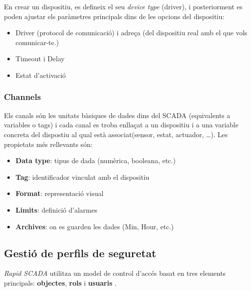 \documentclass[a4paper,11pt,DIV=13,headings=normal,abstract=true,twoside=semi]{article}
\newcommand{\acro}[1]{\textsc{#1}}
\begin{document}
En crear un dispositiu, es defineix el seu \emph{device type} (driver), i posteriorment es poden ajustar els paràmetres principals dins de les opcions del dispositiu:


\begin{itemize}
    \item Driver (protocol de comunicació) i adreça (del dispositiu real amb el que vols comunicar-te.)
    \item Timeout i Delay
    \item Estat d'activació
\end{itemize}


\subsubsection*{Channels}

Els canals \cite{rapidscada_channels} són les unitats bàsiques de dades dins del \acro{SCADA} (equivalents a variables o tags) i cada canal es troba enllaçat a un dispositiu i a una variable concreta del dispostiu al qual està associat(sensor, estat, actuador, \dots). Les propietats més rellevants són:

\begin{itemize}
    \item \textbf{Data type}: tipus de dada (numèrica, booleana, etc.)
    \item \textbf{Tag}: identificador vinculat amb el dispositiu
    \item \textbf{Format}: representació visual
    \item \textbf{Limits}: definició d'alarmes
    \item \textbf{Archives}: on es guarden les dades (Min, Hour, etc.)
\end{itemize}

\subsection{Gestió de perfils de seguretat}
\label{sec:scada_users}


\emph{Rapid SCADA} utilitza un model de control d'accés basat en tres elements principals: \textbf{objectes}, \textbf{rols} i \textbf{usuaris} \cite{rapidscada_user_management}.
\end{document}
